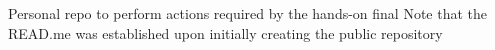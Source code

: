 Personal repo to perform actions required by the hands-\/on final Note that the R\+E\+A\+D.\+me was established upon initially creating the public repository 